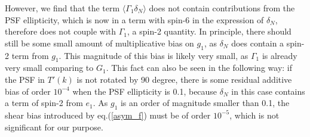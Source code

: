 \documentclass[onecolumn]{aastex62}
\begin{document}
However, we find that the term $\langle\Gamma_1\delta_N\rangle$ does not contain contributions from the PSF ellipticity, which is now in a term with spin-6 in the expression of $\delta_N$, therefore does not couple with $\Gamma_1$, a spin-2 quantity. In principle, there should still be some small amount of multiplicative bias on $g_1$, as $\delta_N$ does contain a spin-2 term from $g_1$. This magnitude of this bias is likely very small, as $\Gamma_1$ is already very small comparing to $G_1$. This fact can also be seen in the following way: if the PSF in $T'(k)$ is not rotated by 90 degree, there is some residual additive bias of order $10^{-4}$ when the PSF ellipticity is 0.1, because $\delta_N$ in this case contains a term of spin-2 from $e_1$. As $g_1$ is an order of magnitude smaller than 0.1, the shear bias introduced by eq.(\ref{asym_f}) must be of order $10^{-5}$, which is not significant for our purpose.     



\end{document}
